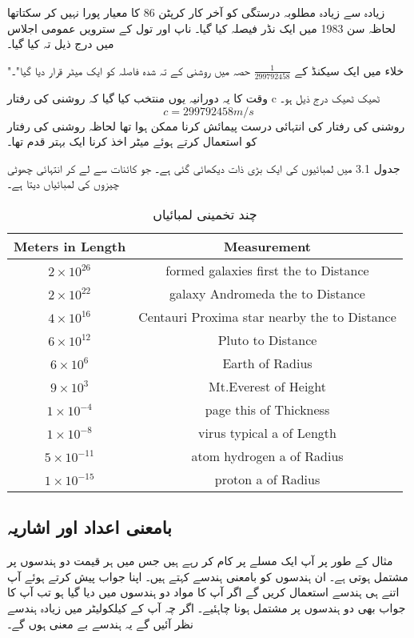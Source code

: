 	زیادہ سے زیادہ مطلوبہ درستگی کو آخر کار کرپٹن 86 کا معیار پورا نہیں کر سکتاتھا لحاظہ سن 1983 میں ایک نڈر فیصلہ کیا گیا۔ ناپ اور تول کے سترویں عمومی اجلاس میں درج ذیل تہ کیا گیا۔
	
	"خلاء میں ایک سیکنڈ کے \(\frac{1}{299792458}\) حصہ میں روشنی کے تہ شدہ فاصلہ کو ایک میٹر قرار دیا گیا"۔
	
	وقت کا یہ دورانیہ یوں منتخب کیا گیا کہ روشنی کی رفتار c ٹھیک ٹھیک درج ذیل ہو۔
	\[c = 299792458 m/s\]
	روشنی کی رفتار کی انتہائی درست پیمائش کرنا ممکن ہوا تھا لحاظہ روشنی کی رفتار کو استعمال کرتے ہوئے میٹر اخذ کرنا ایک بہتر قدم تھا۔
	
	جدول 3.1 میں لمبائیوں کی ایک بڑی ذات دیکھائی گئی ہے۔ جو کائنات سے لے کر انتہائی چھوٹی چیزوں کی لمبائیاں دیتا ہے۔
	\begin{table}[h!]
			\caption{چند تخمینی لمبائیاں}
		\label{جدول_پیمائش_چند_تخمینی_لمائیاں}
		\centering
		\begin{tabular}{||c c||} 
			\hline
			Meters in Length & Measurement\\
			\hline\hline
			$2\times 10^{26}$ & formed galaxies first the to Distance\\
			\hline
			$2\times 10^{22}$ & galaxy Andromeda the to Distance\\
			\hline
			$4\times 10^{16}$ & Centauri Proxima star nearby the to Distance\\
			\hline
			$6\times 10^{12}$ & Pluto to Distance\\
			\hline
			$6\times 10^{6}$ & Earth of Radius\\
			\hline
			$9\times 10^{3}$ & Mt.Everest of Height\\
			\hline
			$1\times 10^{-4}$ & page this of Thickness\\
			\hline
			$1\times 10^{-8}$ & virus typical a of Length\\
			\hline
			$5\times 10^{-11}$ & atom hydrogen a of Radius\\
			\hline
			$1\times 10^{-15}$ & proton a of Radius\\
			\hline
		\end{tabular}
	\end{table}
	\subsection{بامعنی اعداد اور اشاریہ}
	مثال کے طور پر آپ ایک مسلے پر کام کر رہے ہیں جس میں ہر قیمت دو ہندسوں پر مشتمل ہوتی ہے۔ ان ہندسوں کو بامعنی ہندسے کہتے ہیں۔ اپنا جواب پیش کرتے ہوئے آپ اتنے ہی ہندسے استعمال کریں گے اگر آپ کا مواد دو ہندسوں میں دیا گیا ہو تب آپ کا جواب بھی دو ہندسوں پر مشتمل ہونا چاہئیے۔ اگر چہ آپ کے کیلکولیٹر میں زیادہ ہندسے نظر آئیں گے یہ ہندسے بے معنی ہوں گے۔
	
